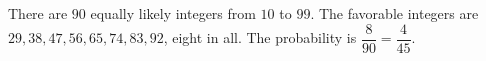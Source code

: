 There are $90$ equally likely integers from $10$ to $99$. The favorable integers are $29,38,47,56,65,74,83,92$, eight in all. The probability is $\dfrac{8}{90}=\boxed{\dfrac{4}{45}}$.
